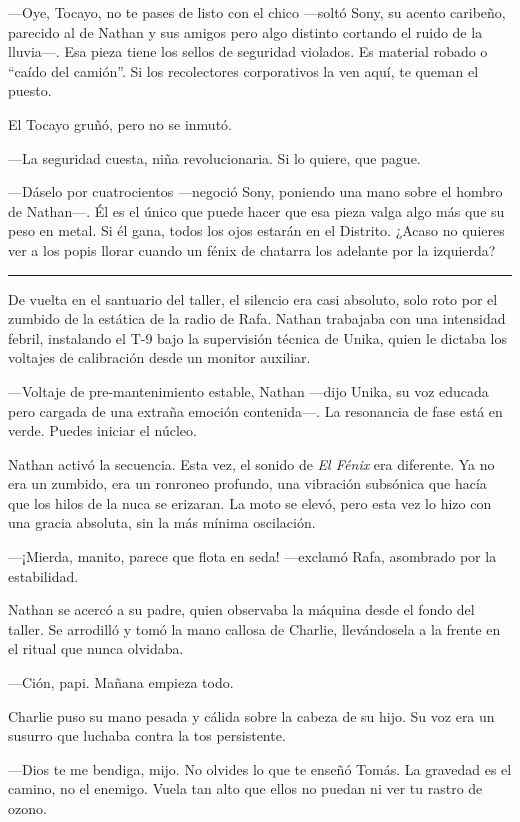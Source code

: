 \documentclass[12pt,a4paper]{book}
\begin{document}
---Oye, Tocayo, no te pases de listo con el chico ---soltó Sony, su acento caribeño, parecido al de Nathan y sus amigos pero algo distinto cortando el ruido de la lluvia---. Esa pieza tiene los sellos de seguridad violados. Es material robado o ``caído del camión''. Si los recolectores corporativos la ven aquí, te queman el puesto.

El Tocayo gruñó, pero no se inmutó.

---La seguridad cuesta, niña revolucionaria. Si lo quiere, que pague.

---Dáselo por cuatrocientos ---negoció Sony, poniendo una mano sobre el hombro de Nathan---. Él es el único que puede hacer que esa pieza valga algo más que su peso en metal. Si él gana, todos los ojos estarán en el Distrito. ¿Acaso no quieres ver a los popis llorar cuando un fénix de chatarra los adelante por la izquierda?

\bigskip
\noindent\rule{\textwidth}{0.4pt}
\bigskip

De vuelta en el santuario del taller, el silencio era casi absoluto, solo roto por el zumbido de la estática de la radio de Rafa. Nathan trabajaba con una intensidad febril, instalando el T-9 bajo la supervisión técnica de Unika, quien le dictaba los voltajes de calibración desde un monitor auxiliar.

---Voltaje de pre-mantenimiento estable, Nathan ---dijo Unika, su voz educada pero cargada de una extraña emoción contenida---. La resonancia de fase está en verde. Puedes iniciar el núcleo.

Nathan activó la secuencia. Esta vez, el sonido de \textit{El Fénix} era diferente. Ya no era un zumbido, era un ronroneo profundo, una vibración subsónica que hacía que los hilos de la nuca se erizaran. La moto se elevó, pero esta vez lo hizo con una gracia absoluta, sin la más mínima oscilación.

---¡Mierda, manito, parece que flota en seda! ---exclamó Rafa, asombrado por la estabilidad.

Nathan se acercó a su padre, quien observaba la máquina desde el fondo del taller. Se arrodilló y tomó la mano callosa de Charlie, llevándosela a la frente en el ritual que nunca olvidaba.

---Ción, papi. Mañana empieza todo.

Charlie puso su mano pesada y cálida sobre la cabeza de su hijo. Su voz era un susurro que luchaba contra la tos persistente.

---Dios te me bendiga, mijo. No olvides lo que te enseñó Tomás. La gravedad es el camino, no el enemigo. Vuela tan alto que ellos no puedan ni ver tu rastro de ozono.
\end{document}
